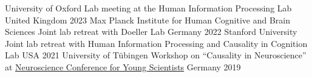 \begin{cvhonors}
    \cvhonor
    {University of Oxford} %
    {Lab meeting at the Human Information Processing Lab} %
    {United Kingdom} %
    {2023} %
    \cvhonor
    {Max Planck Institute for Human Cognitive and Brain Sciences} %
    {Joint lab retreat with Doeller Lab} %
    {Germany} %
    {2022} %
    \cvhonor
    {Stanford University} %
    {Joint lab retreat with Human Information Processing and Causality in Cognition Lab} %
    {USA} %
    {2021} %
    \cvhonor
    {University of Tübingen} %
    {Workshop on ``Causality in Neuroscience'' at \href{https://nenaconference.wordpress.com/wp-content/uploads/2019/10/schedule_nena2019.pdf}{Neuroscience Conference for Young Scientists}} %
    {Germany} %
    {2019} %
\\
\end{cvhonors}


